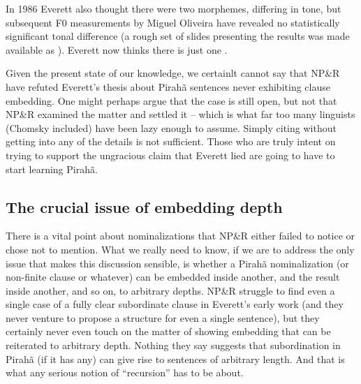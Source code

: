 \documentclass[output=paper,colorlinks,citecolor=brown
]{langscibook}
\begin{document}
In 1986 Everett also thought there were two \mbox{}
morphemes, differing in tone, but subsequent F0 measurements by Miguel
Oliveira have revealed no statistically significant tonal difference
(a rough set of slides presenting the results was made available as
\citealt{OlivEver10}). Everett now thinks there is just one
\mbox{}.

Given the present state of our knowledge, we certainlt cannot say that
NP\&R have refuted Everett's thesis about Pirah{\~a} sentences never
exhibiting clause embedding. One might perhaps argue that the case
is still open, but not that NP\&R examined the matter and settled it
-- which is what far too many linguists (Chomsky included) have been
lazy enough to assume. Simply citing \citet{NevPesRod09a} without
getting into any of the details is not sufficient. Those who are truly
intent on trying to support the ungracious claim that Everett lied
are going to have to start learning Pirah{\~a}.

\subsection{The crucial issue of embedding depth}

There is a vital point about nominalizations that NP\&R either failed
to notice or chose not to mention. What we really need to know, if we
are to address the only issue that makes this discussion sensible, is
whether a Pirah{\~a} nominalization (or non-finite clause or whatever)
can be embedded inside another, and the result inside another, and so
on, to arbitrary depths. NP\&R struggle to find even a single case of
a fully clear subordinate clause in Everett's early work (and they
never venture to propose a structure for even a single sentence), but
they certainly never even touch on the matter of showing embedding that
can be reiterated to arbitrary depth. Nothing they say suggests that
subordination in Pirah{\~a} (if it has any) can give rise to sentences
of arbitrary length. And that is what any serious notion of ``recursion''
has to be about.
\end{document}
